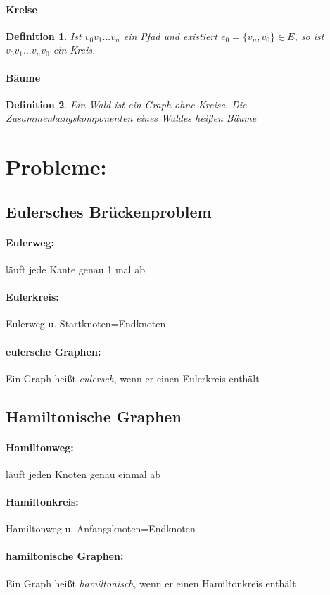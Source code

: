 \documentclass[12pt]{article}
\numberwithin{equation}{subsection}
\newtheorem{df}{Definition}
\begin{document}
	\paragraph{Kreise}
	\begin{df} Ist $v_0v_1...v_n$ ein Pfad und existiert $e_0=\{v_n,v_0\}\in E$, so ist $v_0v_1...v_nv_0$ ein Kreis.
	\end{df}
	\paragraph{Bäume}
	\begin{df} Ein \textit{Wald} ist ein Graph ohne Kreise. Die Zusammenhangskomponenten eines Waldes heißen \textit{Bäume}
	\end{df}
	\section{Probleme:}
	\subsection{Eulersches Brückenproblem}
	\paragraph{Eulerweg:} läuft jede Kante genau 1 mal ab
	\paragraph{Eulerkreis:} Eulerweg u. Startknoten=Endknoten
	\paragraph{eulersche Graphen:} Ein Graph heißt \textit{eulersch}, wenn er einen Eulerkreis enthält
	\subsection{Hamiltonische Graphen}
	\paragraph{Hamiltonweg:} läuft jeden Knoten genau einmal ab
	\paragraph{Hamiltonkreis:} Hamiltonweg u. Anfangsknoten=Endknoten
	\paragraph{hamiltonische Graphen:} Ein Graph heißt \textit{hamiltonisch}, wenn er einen Hamiltonkreis enthält
\end{document}
